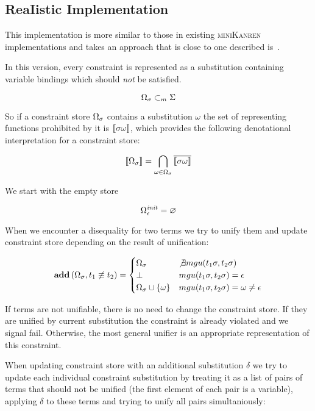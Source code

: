 \subsection{ReaIistic Implementation}

This implementation is more similar to those in existing \textsc{miniKanren} implementations and takes an approach that is close to one described is~\cite{CKanren}.

In this version, every constraint is represented as a substitution containing variable bindings which should \emph{not} be satisfied.

\[ \Omega_\sigma \subset_m \Sigma \]

So if a constraint store $\Omega_\sigma$ contains a substitution $\omega$ the set of representing functions prohibited by it is $\llbracket{\sigma \omega}\rrbracket$,
which provides the following denotational interpretation for a constraint store:

\[ \llbracket{\Omega_\sigma}\rrbracket = \bigcap_{\omega \in \Omega_\sigma} \overline{ \llbracket{\sigma \omega}\rrbracket } \]

We start with the empty store

\[ \Omega_\epsilon^{\mathit{init}} = \varnothing \]

When we encounter a disequality for two terms we try to unify them and update constraint store depending on the result of unification:

\[
\mathbf{add}\,(\Omega_\sigma, t_1 \not\equiv t_2) =
    \begin{cases}
       \Omega_\sigma                                & \not\exists mgu(t_1 \sigma, t_2 \sigma) \\
       \bot                                                 & mgu(t_1 \sigma, t_2 \sigma) = \epsilon \\
       \Omega_\sigma \cup \{\omega\}      & mgu(t_1 \sigma, t_2 \sigma) = \omega \neq \epsilon
    \end{cases}
\]

If terms are not unifiable, there is no need to change the constraint store. If they are unified by current substitution the constraint is already violated and we signal fail.
Otherwise, the most general unifier is an appropriate representation of this constraint.

When updating constraint store with an additional substitution $\delta$ we try to update each individual constraint substitution by treating it
as a list of pairs of terms that should not be unified (the first element of each pair is a variable), applying $\delta$ to these terms and trying to
unify all pairs simultaniously:

